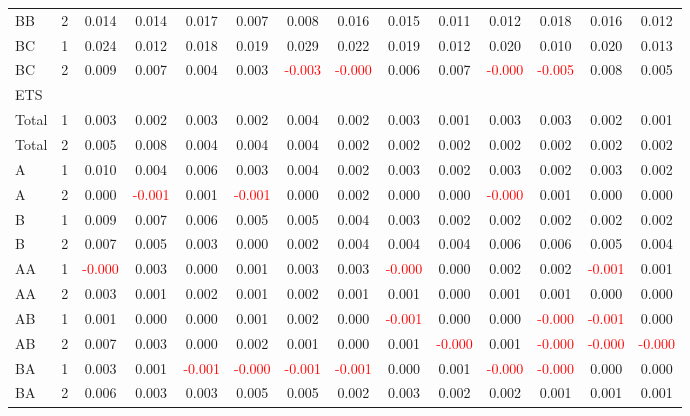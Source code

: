 \begin{table}[!htb]
{\begin{tabular}{llcccccccccccc}
BB & 2 & 0.014 & 0.014 & 0.017 & 0.007 & 0.008 & 0.016 & 0.015 & 0.011 & 0.012 & 0.018 & 0.016 & 0.012\\
BC & 1 & 0.024 & 0.012 & 0.018 & 0.019 & 0.029 & 0.022 & 0.019 & 0.012 & 0.020 & 0.010 & 0.020 & 0.013\\
BC & 2 & 0.009 & 0.007 & 0.004 & 0.003 & \textcolor{red}{-0.003} & \textcolor{red}{-0.000} & 0.006 & 0.007 & \textcolor{red}{-0.000} & \textcolor{red}{-0.005} & 0.008 & 0.005\\
\hline
ETS &  &  &  &  &  &  &  &  &  &  &  &  & \\
\hline
Total & 1 & 0.003 & 0.002 & 0.003 & 0.002 & 0.004 & 0.002 & 0.003 & 0.001 & 0.003 & 0.003 & 0.002 & 0.001\\
Total & 2 & 0.005 & 0.008 & 0.004 & 0.004 & 0.004 & 0.002 & 0.002 & 0.002 & 0.002 & 0.002 & 0.002 & 0.002\\
A & 1 & 0.010 & 0.004 & 0.006 & 0.003 & 0.004 & 0.002 & 0.003 & 0.002 & 0.003 & 0.002 & 0.003 & 0.002\\
A & 2 & 0.000 & \textcolor{red}{-0.001} & 0.001 & \textcolor{red}{-0.001} & 0.000 & 0.002 & 0.000 & 0.000 & \textcolor{red}{-0.000} & 0.001 & 0.000 & 0.000\\
B & 1 & 0.009 & 0.007 & 0.006 & 0.005 & 0.005 & 0.004 & 0.003 & 0.002 & 0.002 & 0.002 & 0.002 & 0.002\\
B & 2 & 0.007 & 0.005 & 0.003 & 0.000 & 0.002 & 0.004 & 0.004 & 0.004 & 0.006 & 0.006 & 0.005 & 0.004\\
AA & 1 & \textcolor{red}{-0.000} & 0.003 & 0.000 & 0.001 & 0.003 & 0.003 & \textcolor{red}{-0.000} & 0.000 & 0.002 & 0.002 & \textcolor{red}{-0.001} & 0.001\\
AA & 2 & 0.003 & 0.001 & 0.002 & 0.001 & 0.002 & 0.001 & 0.001 & 0.000 & 0.001 & 0.001 & 0.000 & 0.000\\
AB & 1 & 0.001 & 0.000 & 0.000 & 0.001 & 0.002 & 0.000 & \textcolor{red}{-0.001} & 0.000 & 0.000 & \textcolor{red}{-0.000} & \textcolor{red}{-0.001} & 0.000\\
AB & 2 & 0.007 & 0.003 & 0.000 & 0.002 & 0.001 & 0.000 & 0.001 & \textcolor{red}{-0.000} & 0.001 & \textcolor{red}{-0.000} & \textcolor{red}{-0.000} & \textcolor{red}{-0.000}\\
BA & 1 & 0.003 & 0.001 & \textcolor{red}{-0.001} & \textcolor{red}{-0.000} & \textcolor{red}{-0.001} & \textcolor{red}{-0.001} & 0.000 & 0.001 & \textcolor{red}{-0.000} & \textcolor{red}{-0.000} & 0.000 & 0.000\\
BA & 2 & 0.006 & 0.003 & 0.003 & 0.005 & 0.005 & 0.002 & 0.003 & 0.002 & 0.002 & 0.001 & 0.001 & 0.001\\

\end{tabular}}
\end{table}
